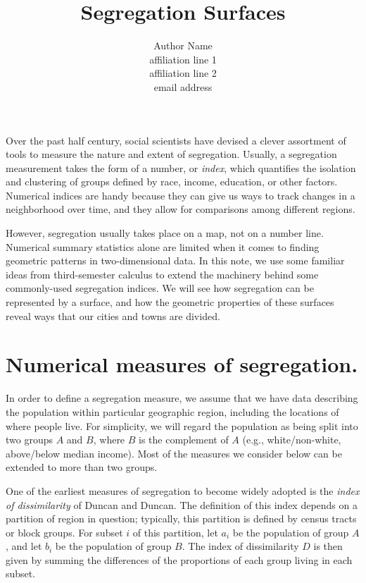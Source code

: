 \documentclass{article}
\theoremstyle{theorem}
\theoremstyle{definition}
\begin{document}
\title{Segregation Surfaces}

\author{Author Name\\               %
\scriptsize affiliation line 1\\    %
affiliation line 2\\                %
email address}                      %

\maketitle

\noindent Over the past half century, social scientists have devised a clever assortment of tools to measure the nature and extent of segregation. \cite{harrisjohnson18} Usually, a segregation measurement takes the form of a number, or \textit{index}, which quantifies the isolation and clustering of groups defined by race, income, education, or other factors. Numerical indices are handy because they can give us ways to track changes in a neighborhood over time, and they allow for comparisons among different regions.

However, segregation usually takes place on a map, not on a number line. Numerical summary statistics alone are limited when it comes to finding geometric patterns in two-dimensional data. In this note, we use some familiar ideas from third-semester calculus to extend the machinery behind some commonly-used segregation indices. We will see how segregation can be represented by a surface, and how the geometric properties of these surfaces reveal ways that our cities and towns are divided.

\section{Numerical measures of segregation.}

In order to define a segregation measure, we assume that we have data describing the population within particular geographic region, including the locations of where people live. For simplicity, we will regard the population as being split into two groups $A$ and $B$, where $B$ is the complement of $A$ (e.g., white/non-white, above/below median income). Most of the measures we consider below can be extended to more than two groups.

One of the earliest measures of segregation to become widely adopted is the \textit{index of dissimilarity} of Duncan and Duncan. \cite{duncan55} The definition of this index depends on a partition of region in question; typically, this partition is defined by census tracts or block groups. For subset $i$ of this partition, let $a_i$ be the population of group $A$, and let $b_i$ be the population of group $B$. The index of dissimilarity $D$ is then given by summing the differences of the proportions of each group living in each subset.
\end{document}
